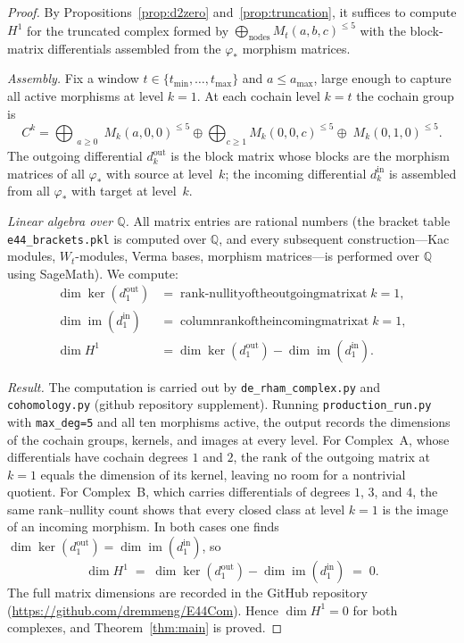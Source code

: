 \documentclass[reqno,10pt]{amsart}
\theoremstyle{definition}
\begin{document}
\begin{proof}
By Propositions~\ref{prop:d2zero} and~\ref{prop:truncation}, it suffices to
compute $H^1$ for the truncated complex formed by
$\bigoplus_{\text{nodes}} M_t(a,b,c)^{\leq 5}$ with the block-matrix
differentials assembled from the $\varphi_*$ morphism matrices.

\smallskip
\noindent\textit{Assembly.}
Fix a window $t\in\{t_{\min},\ldots,t_{\max}\}$ and $a\leq a_{\max}$, large
enough to capture all active morphisms at level $k=1$.  At each cochain
level $k=t$ the cochain group is
\[
  C^k = \bigoplus_{\substack{a\geq 0}} M_k(a,0,0)^{\leq 5}
        \oplus\bigoplus_{c\geq 1} M_k(0,0,c)^{\leq 5}
        \oplus\; M_k(0,1,0)^{\leq 5}.
\]
The outgoing differential $d^{\text{out}}_k$ is the block matrix whose
blocks are the morphism matrices of all $\varphi_*$ with source at level~$k$;
the incoming differential $d^{\text{in}}_k$ is assembled from all $\varphi_*$
with target at level~$k$.

\smallskip
\noindent\textit{Linear algebra over $\mathbb{Q}$.}
All matrix entries are rational numbers (the bracket table
\texttt{e44\_brackets.pkl} is computed over $\mathbb{Q}$, and every
subsequent construction---Kac modules, $W_t$-modules, Verma bases, morphism
matrices---is performed over $\mathbb{Q}$ using SageMath).  We compute:
\begin{align*}
  \dim\ker(d^{\text{out}}_1) &= \operatorname{rank-nullity of the outgoing matrix at }k=1,\\
  \dim\operatorname{im}(d^{\text{in}}_1) &= \operatorname{column rank of the incoming matrix at }k=1,\\
  \dim H^1 &= \dim\ker(d^{\text{out}}_1) - \dim\operatorname{im}(d^{\text{in}}_1).
\end{align*}

\noindent\textit{Result.}
The computation is carried out by \texttt{de\_rham\_complex.py} and
\texttt{cohomology.py} (github repository supplement).  Running
\texttt{production\_run.py} with \texttt{max\_deg=5} and all ten morphisms
active, the output records the dimensions of the cochain groups, kernels,
and images at every level.  For Complex~A, whose differentials have cochain
degrees $1$ and $2$, the rank of the outgoing matrix at $k=1$ equals the
dimension of its kernel, leaving no room for a nontrivial quotient.
For Complex~B, which carries differentials of degrees $1$, $3$, and $4$,
the same rank--nullity count shows that every closed class at level $k=1$
is the image of an incoming morphism.  In both cases one finds
$\dim\ker(d^{\text{out}}_1) = \dim\operatorname{im}(d^{\text{in}}_1)$,
so
\[
  \dim H^1 \;=\; \dim\ker(d^{\text{out}}_1) - \dim\operatorname{im}(d^{\text{in}}_1) \;=\; 0.
\]
The full matrix dimensions are recorded in the GitHub repository
(\url{https://github.com/dremmeng/E44Com}).
Hence $\dim H^1 = 0$ for both complexes, and Theorem~\ref{thm:main} is
proved.
\end{proof}
\end{document}
